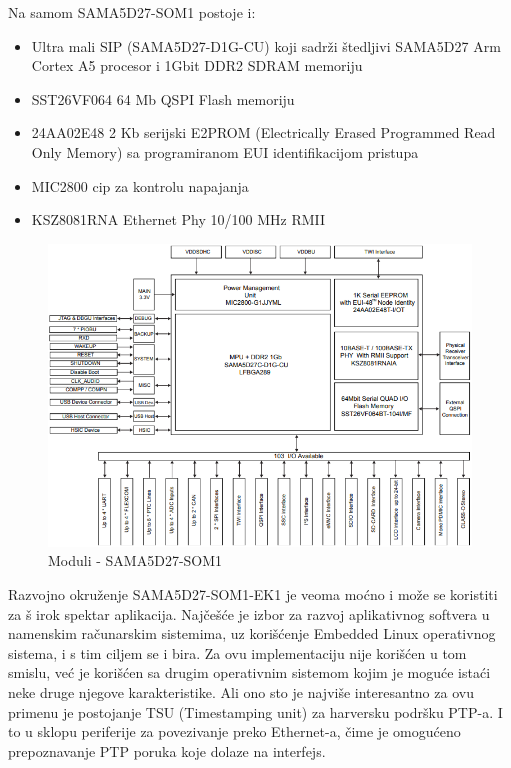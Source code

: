 \documentclass[a4paper,12pt, master]{etf}
\begin{document}
	Na samom SAMA5D27-SOM1 postoje i:
	\begin{itemize}
		\item Ultra mali SIP (SAMA5D27-D1G-CU) koji sadr\v{z}i \v{s}tedljivi SAMA5D27 Arm Cortex
		A5 procesor i 1Gbit DDR2 SDRAM memoriju
		\item SST26VF064 64 Mb QSPI Flash memoriju
		\item 24AA02E48 2 Kb serijski E2PROM (Electrically Erased Programmed Read Only Memory)
		sa programiranom EUI identifikacijom pristupa
		\item MIC2800 cip za kontrolu napajanja
		\item KSZ8081RNA Ethernet Phy 10/100 MHz RMII
	\end{itemize}

        \begin{figure}[htb]
                \centering
                \includegraphics[scale=.5]{../pic/hw_som_modules.PNG}
                \caption{Moduli - SAMA5D27-SOM1}
                \label{fig:hw_som_modules}
        \end{figure}

	Razvojno okru\v{z}enje SAMA5D27-SOM1-EK1 je veoma mo\'{c}no i mo\v{z}e se koristiti za \v{s}
	irok spektar aplikacija. Naj\v{c}e\v{s}\'{c}e je izbor za razvoj aplikativnog softvera u
	namenskim ra\v{c}unarskim sistemima, uz kori\v{s}\'{c}enje Embedded Linux operativnog
	sistema, i s tim ciljem se i bira. Za ovu implementaciju nije kori\v{s}\'{c}en u tom smislu,
	ve\'{c} je kori\v{s}\'{c}en sa drugim operativnim sistemom kojim je mogu\'{c}e ista\'{c}i
	neke druge njegove karakteristike. Ali ono sto je najvi\v{s}e interesantno za ovu primenu je
	postojanje TSU (Timestamping unit) za harversku podr\v{s}ku PTP-a. I to u sklopu periferije
        za povezivanje preko Ethernet-a, \v{c}ime je omogu\'{c}eno prepoznavanje PTP poruka koje dolaze
	na interfejs.
\end{document}
